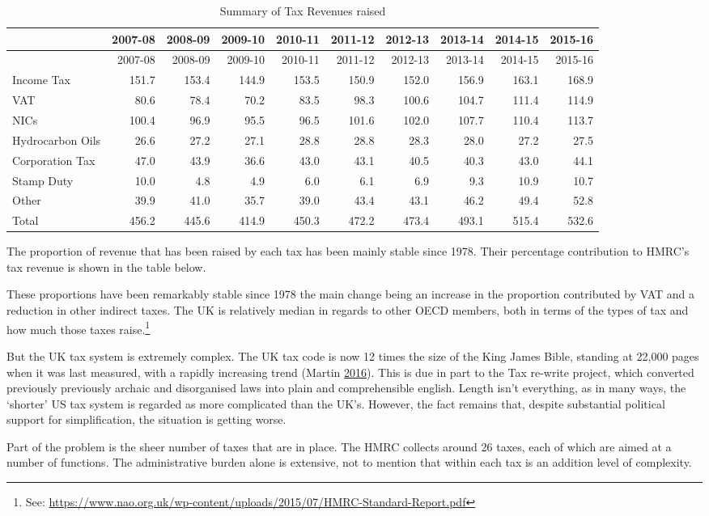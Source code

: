 \documentclass[]{tufte-handout}
\begin{document}
\begin{longtable}[]{@{}lrrrrrrrrr@{}}
\caption{Summary of Tax Revenues raised}\tabularnewline
\toprule
& 2007-08 & 2008-09 & 2009-10 & 2010-11 & 2011-12 & 2012-13 & 2013-14 &
2014-15 & 2015-16\tabularnewline
\midrule
\endfirsthead
\toprule
& 2007-08 & 2008-09 & 2009-10 & 2010-11 & 2011-12 & 2012-13 & 2013-14 &
2014-15 & 2015-16\tabularnewline
\midrule
\endhead
Income Tax & 151.7 & 153.4 & 144.9 & 153.5 & 150.9 & 152.0 & 156.9 &
163.1 & 168.9\tabularnewline
VAT & 80.6 & 78.4 & 70.2 & 83.5 & 98.3 & 100.6 & 104.7 & 111.4 &
114.9\tabularnewline
NICs & 100.4 & 96.9 & 95.5 & 96.5 & 101.6 & 102.0 & 107.7 & 110.4 &
113.7\tabularnewline
Hydrocarbon Oils & 26.6 & 27.2 & 27.1 & 28.8 & 28.8 & 28.3 & 28.0 & 27.2
& 27.5\tabularnewline
Corporation Tax & 47.0 & 43.9 & 36.6 & 43.0 & 43.1 & 40.5 & 40.3 & 43.0
& 44.1\tabularnewline
Stamp Duty & 10.0 & 4.8 & 4.9 & 6.0 & 6.1 & 6.9 & 9.3 & 10.9 &
10.7\tabularnewline
Other & 39.9 & 41.0 & 35.7 & 39.0 & 43.4 & 43.1 & 46.2 & 49.4 &
52.8\tabularnewline
Total & 456.2 & 445.6 & 414.9 & 450.3 & 472.2 & 473.4 & 493.1 & 515.4 &
532.6\tabularnewline
\bottomrule
\end{longtable}

The proportion of revenue that has been raised by each tax has been
mainly stable since 1978. Their percentage contribution to HMRC's tax
revenue is shown in the table below.

These proportions have been remarkably stable since 1978 the main change
being an increase in the proportion contributed by VAT and a reduction
in other indirect taxes. The UK is relatively median in regards to other
OECD members, both in terms of the types of tax and how much those taxes
raise.\footnote{See:
  \url{https://www.nao.org.uk/wp-content/uploads/2015/07/HMRC-Standard-Report.pdf}}

But the UK tax system is extremely complex. The UK tax code is now 12
times the size of the King James Bible, standing at 22,000 pages when it
was last measured, with a rapidly increasing trend (Martin
\protect\hyperlink{ref-Martin}{2016}). This is due in part to the Tax
re-write project, which converted previously previously archaic and
disorganised laws into plain and comprehensible english. Length isn't
everything, as in many ways, the `shorter' US tax system is regarded as
more complicated than the UK's. However, the fact remains that, despite
substantial political support for simplification, the situation is
getting worse.

Part of the problem is the sheer number of taxes that are in place. The
HMRC collects around 26 taxes, each of which are aimed at a number of
functions. The administrative burden alone is extensive, not to mention
that within each tax is an addition level of complexity.
\end{document}
